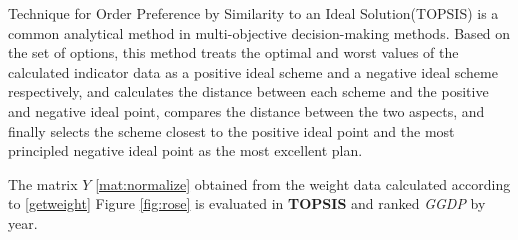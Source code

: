 \documentclass[12pt]{article}
\begin{document}
	Technique for Order Preference by Similarity to an Ideal Solution(TOPSIS) is a common analytical method in multi-objective decision-making methods.
	Based on the set of options, this method treats the optimal and worst values of the calculated indicator data as a positive ideal scheme and a negative ideal scheme respectively, and calculates the distance between each scheme and the positive and negative ideal point, compares the distance between the two aspects, and finally selects the scheme closest to the positive ideal point and the most principled negative ideal point as the most excellent plan.
	
	The matrix $Y$ \eqref{mat:normalize} obtained from the weight data calculated according to \ref{getweight} Figure \ref{fig:rose} is evaluated in \textbf{TOPSIS} and ranked \textit{GGDP} by year.
	
\end{document}
